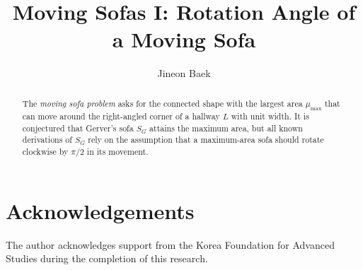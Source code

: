 \documentclass[11pt, letterpaper]{amsart}
\title{Moving Sofas I: Rotation Angle of a Moving Sofa}
\author{Jineon Baek}
\theoremstyle{plain}
\theoremstyle{definition}
\theoremstyle{remark}
\begin{document}
\maketitle

\begin{abstract}
The \emph{moving sofa problem} asks for the connected shape with the largest area $\mu_{\text{max}}$
that can move around the right-angled corner of a hallway $L$ with unit width.
It is conjectured that Gerver's sofa $S_G$ attains the maximum area,
but all known derivations of $S_G$ rely on the assumption that
a maximum-area sofa should rotate clockwise by $\pi/2$ in its movement.
\end{abstract}



\section*{Acknowledgements}

The author acknowledges support from the Korea Foundation for Advanced Studies during the completion of this research.


\printbibliography
\end{document}
